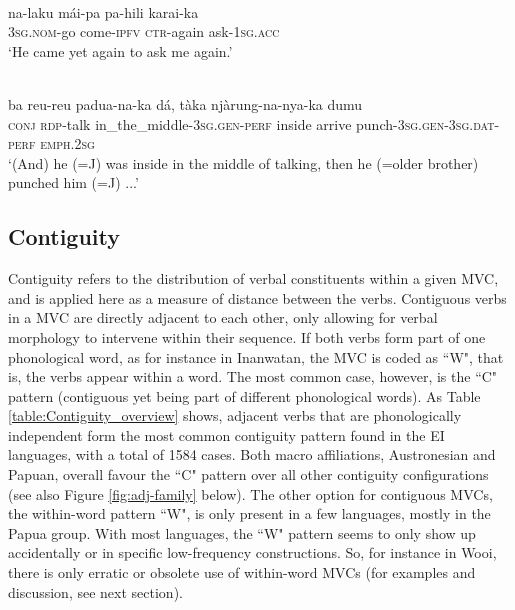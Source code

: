 \ea \label{kambera001}
\\
\gll na-laku mái-pa pa-hili karai-ka \\
3\textsc{sg}.\textsc{nom}-go come-\textsc{ipfv} \textsc{ctr}-again ask-1\textsc{sg}.\textsc{acc} \\
\glft `He came yet again to ask me again.'\\ 
\z

\ea \label{kambera002}
\\
\gll ba reu-reu padua-na-ka dá, tàka njàrung-na-nya-ka dumu \\
\textsc{conj} \textsc{rdp}-talk in\_the\_middle-3\textsc{sg}.\textsc{gen}-\textsc{perf} inside arrive punch-3\textsc{sg}.\textsc{gen}-3\textsc{sg}.\textsc{dat}-\textsc{perf} \textsc{emph}.2\textsc{sg} \\
\glft `(And) he (=J) was inside in the middle of talking, then he (=older brother) punched him (=J) ...'\\ 
\z

\subsection{Contiguity}\label{sec:contiguity}

Contiguity refers to the distribution of verbal constituents within a given MVC, and is applied here as a measure of distance between the verbs. Contiguous verbs in a MVC are directly adjacent to each other, only allowing for verbal morphology to intervene within their sequence. If both verbs form part of one phonological word, as for instance in Inanwatan, the MVC is coded as ``W", that is, the verbs appear within a word. The most common case, however, is the ``C" pattern (contiguous yet being part of different phonological words). As Table \ref{table:Contiguity_overview} shows, adjacent verbs that are phonologically independent form the most common contiguity pattern found in the EI languages, with a total of 1584 cases. Both macro affiliations, Austronesian and Papuan, overall favour the ``C" pattern over all other contiguity configurations (see also Figure \ref{fig:adj-family} below). The other option for contiguous MVCs, the within-word pattern ``W", is only present in a few languages, mostly in the Papua group. With most languages, the ``W" pattern seems to only show up accidentally or in specific low-frequency constructions. So, for instance in Wooi, there is only erratic or obsolete use of within-word MVCs (for examples and discussion, see next section).

